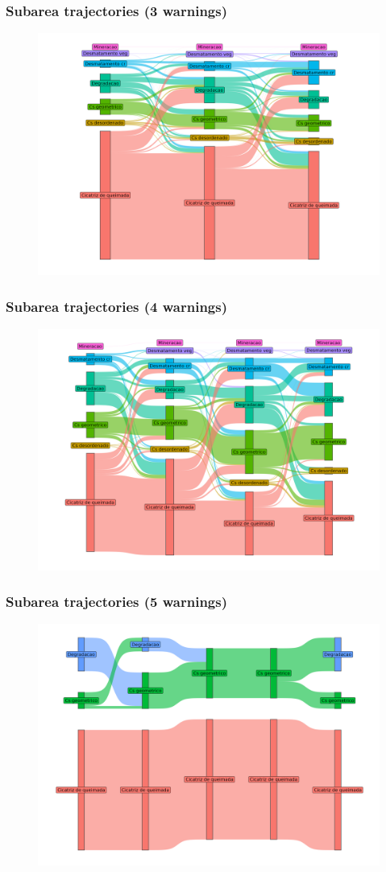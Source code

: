 \documentclass[aspectratio=169]{beamer}
\begin{document}
\begin{frame}
    \frametitle{Subarea trajectories (3 warnings)}
    \begin{figure}[h]
        \includegraphics[width=0.75\linewidth]
        {./figures/plot_deter_subarea_trajectory_3.png}
    \end{figure}
\end{frame}

\begin{frame}
    \frametitle{Subarea trajectories (4 warnings)}
    \begin{figure}[h]
        \includegraphics[width=0.75\linewidth]
        {./figures/plot_deter_subarea_trajectory_4.png}
    \end{figure}
\end{frame}

\begin{frame}
    \frametitle{Subarea trajectories (5 warnings)}
    \begin{figure}[h]
        \includegraphics[width=0.75\linewidth]
        {./figures/plot_deter_subarea_trajectory_5.png}
    \end{figure}
\end{frame}
\end{document}
